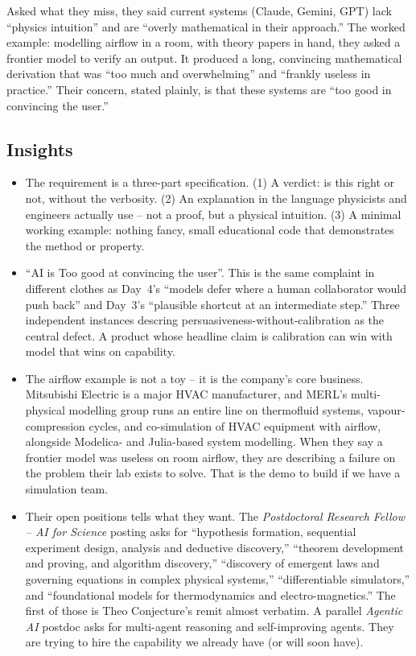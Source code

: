 \documentclass[11pt]{article}
\begin{document}
Asked what they miss, they said current systems (Claude, Gemini, GPT) lack ``physics intuition'' and are ``overly mathematical in their approach.'' The worked example: modelling airflow in a room, with theory papers in hand, they asked a frontier model to verify an output. It produced a long, convincing mathematical derivation that was ``too much and overwhelming'' and ``frankly useless in practice.'' Their concern, stated plainly, is that these systems are ``too good in convincing the user.''

\subsection*{Insights}
\begin{itemize}
    \item The requirement is a three-part specification. (1) A verdict: is this right or not, without the verbosity. (2) An explanation in the language physicists and engineers actually use -- not a proof, but a physical intuition. (3) A minimal working example: nothing fancy, small educational code that demonstrates the method or property.
    \item ``AI is Too good at convincing the user''. This is the same complaint in different clothes as Day~4's ``models defer where a human collaborator would push back'' and Day~3's ``plausible shortcut at an intermediate step.'' Three independent instances descring persuasiveness-without-calibration as the central defect. A product whose headline claim is calibration can win with model that wins on capability.
    \item The airflow example is not a toy -- it is the company's core business. Mitsubishi Electric is a major HVAC manufacturer, and MERL's multi-physical modelling group runs an entire line on thermofluid systems, vapour-compression cycles, and co-simulation of HVAC equipment with airflow, alongside Modelica- and Julia-based system modelling. When they say a frontier model was useless on room airflow, they are describing a failure on the problem their lab exists to solve. That is the demo to build if we have a simulation team.
    \item Their open positions tells what they want. The \emph{Postdoctoral Research Fellow -- AI for Science} posting asks for ``hypothesis formation, sequential experiment design, analysis and deductive discovery,'' ``theorem development and proving, and algorithm discovery,'' ``discovery of emergent laws and governing equations in complex physical systems,'' ``differentiable simulators,'' and ``foundational models for thermodynamics and electro-magnetics.'' The first of those is Theo Conjecture's remit almost verbatim. A parallel \emph{Agentic AI} postdoc asks for multi-agent reasoning and self-improving agents. They are trying to hire the capability we already have (or will soon have).

\end{itemize}
\end{document}
